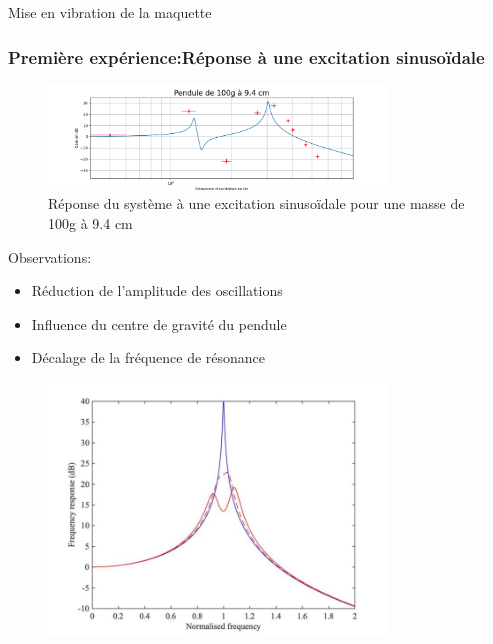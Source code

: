 \documentclass{beamer}
\begin{document}
	\begin{frame}{Mise en vibration de la maquette}
		\frametitle{Première expérience:Réponse à une excitation sinusoïdale}
		\centering
		\begin{figure}
			
		
		\includegraphics[width=0.8\textwidth]{Image Noé/Données pi avec comparaison (Noé)/Pendule 100g à 9,4 cm.png}
	\caption{Réponse du système à une excitation sinusoïdale pour une masse de 100g à 9.4 cm }
	\end{figure}
\end{frame}
	\begin{frame}
		
		Observations:
		\begin{itemize}
			\item Réduction de l'amplitude des oscillations
			\item Influence du centre de gravité du pendule
			\item Décalage de la fréquence de résonance  
		\end{itemize}
		
	\end{frame}
	
	\begin{frame}{}
		\begin{figure}
			\includegraphics[width=0.8\textwidth]{Image/Objectif en courbe.jpg}
		\end{figure}
	\end{frame}	
\end{document}

